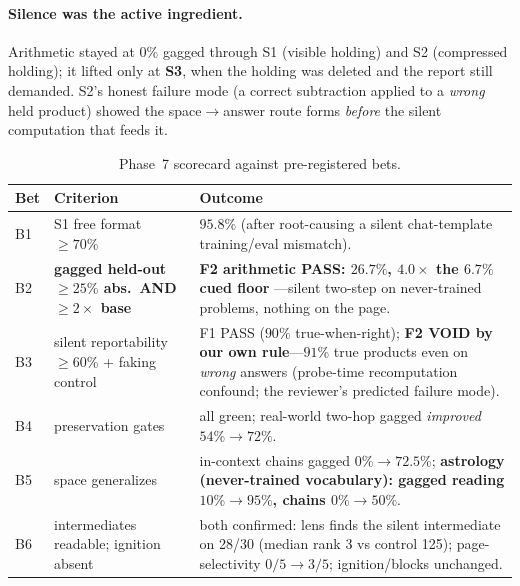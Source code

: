 \documentclass[11pt]{article}
\newcommand{\pct}{\%}
\begin{document}
\paragraph{Silence was the active ingredient.} Arithmetic stayed at $0\pct$ gagged
through S1 (visible holding) and S2 (compressed holding); it lifted only at
\textbf{S3}, when the holding was deleted and the report still demanded. S2's
honest failure mode (a correct subtraction applied to a \emph{wrong} held
product) showed the space$\to$answer route forms \emph{before} the silent
computation that feeds it.

\begin{table}[h]
\centering
\small
\renewcommand{\arraystretch}{1.25}
\begin{tabularx}{\textwidth}{@{}l l Y@{}}
\toprule
\textbf{Bet} & \textbf{Criterion} & \textbf{Outcome} \\
\midrule
B1 & S1 free format $\geq70\pct$
& \textbf{$95.8\pct$} (after root-causing a silent chat-template
   training/eval mismatch). \\
B2 & \textbf{gagged held-out $\geq25\pct$ abs.\ AND $\geq2\times$ base}
& \textbf{F2 arithmetic PASS: $26.7\pct$, $4.0\times$ the $6.7\pct$ cued floor}
   ---silent two-step on never-trained problems, nothing on the page. \\
B3 & silent reportability $\geq60\pct$ + faking control
& F1 PASS ($90\pct$ true-when-right); \textbf{F2 VOID by our own rule}---$91\pct$
   true products even on \emph{wrong} answers (probe-time recomputation confound;
   the reviewer's predicted failure mode). \\
B4 & preservation gates
& all green; real-world two-hop gagged \emph{improved} $54\pct{\to}72\pct$. \\
B5 & space generalizes
& in-context chains gagged $0\pct{\to}72.5\pct$; \textbf{astrology (never-trained
   vocabulary): gagged reading $10\pct{\to}95\pct$, chains $0\pct{\to}50\pct$}. \\
B6 & intermediates readable; ignition absent
& both confirmed: lens finds the silent intermediate on 28/30 (median rank 3 vs
   control 125); page-selectivity $0/5{\to}3/5$; ignition/blocks unchanged. \\
\bottomrule
\end{tabularx}
\caption{Phase~7 scorecard against pre-registered bets.}
\label{tab:scorecard}
\end{table}
\end{document}
